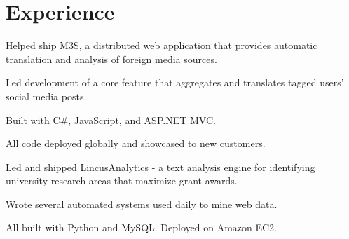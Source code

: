 \documentclass[]{deedy-resume}
\begin{document}
\begin{minipage}[t]{0.61\textwidth}


\section{Experience}
\vspace{\topsep} %
\begin{tightemize}
\item Helped ship M3S, a distributed web application that provides automatic translation and analysis of foreign media sources.
\item Led development of a core feature that aggregates and translates tagged users' social media posts.
\item Built with C\#, JavaScript, and ASP.NET MVC.
\item All code deployed globally and showcased to new customers.
\end{tightemize}
\sectionsep

\begin{tightemize}
\item Led and shipped LincusAnalytics - a text analysis engine for identifying university research areas that maximize grant awards. 
\item Wrote several automated systems used daily to mine web data.
\item All built with Python and MySQL. Deployed on Amazon EC2.
\end{tightemize}
\sectionsep



\end{minipage}
\end{document}
